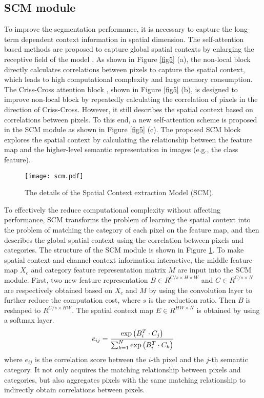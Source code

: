 \documentclass[10pt,journal,cspaper,compsoc]{IEEEtran}
\begin{document}
\subsection{SCM module}
To improve the segmentation performance, it is necessary to capture the long-term dependent context information in spatial dimension. The self-attention based methods are proposed to capture global spatial contexts by enlarging the receptive field of the model \cite{zhao2017pyramid, chen2017rethinking, lin2018multi}. As shown in Figure \ref{fig5} (a), the non-local block \cite{wang2018non} directly calculates correlations between pixels to capture the spatial context, which leads to high computational complexity and large memory consumption. The Criss-Cross attention block \cite{huang2019ccnet}, shown in Figure \ref{fig5} (b), is designed to improve non-local block by repeatedly calculating the correlation of pixels in the direction of Criss-Cross. However, it still describes the spatial context based on correlations between pixels. To this end, a new self-attention scheme is proposed in the SCM module as shown in Figure \ref{fig5} (c). The proposed SCM block explores the spatial context by calculating the relationship between the feature map and the higher-level semantic representation in images (e.g., the class feature).
\begin{figure}[t]
\centering
\texttt{[image: scm.pdf]}
\caption{The details of the Spatial Context extraction Model (SCM).}
\label{fig:scm}
\vspace{-4mm}
\end{figure}
	
To effectively the reduce computational complexity without affecting performance, SCM transforms the problem of learning the spatial context into the problem of matching the category of each pixel on the feature map, and then describes the global spatial context using the correlation between pixels and categories. The structure of the SCM module is shown in Figure \ref{fig:scm}. To make spatial context and channel context information interactive, the middle feature map $X_{c}$ and category feature representation matrix $M$ are input into the SCM module. First, two new feature representation $B\in R^{C/s\times H\times W}$ and $C\in R^{C/s\times N}$ are respectively obtained based on $X_{c}$ and $M$ by using the convolution layer to further reduce the computation cost, where $s$ is the reduction ratio. Then $B$ is reshaped to $R^{C/s\times HW}$. The spatial context map $E\in R^{HW \times N}$ is obtained by using a softmax layer.
\begin{equation}
	\\{e_{ij}} = \frac{{\exp \left( {B_i^{T} \cdot {C_j}} \right)}}{{\sum\nolimits_{k = 1}^N {\exp \left( {B_i^{T} \cdot {C_k}} \right)} }}
\end{equation}
where $e_{ij}$ is the correlation score between the $i$-th pixel and the $j$-th semantic category. It not only acquires the matching relationship between pixels and categories, but also aggregates pixels with the same matching relationship to indirectly obtain correlations between pixels.
	
\end{document}
